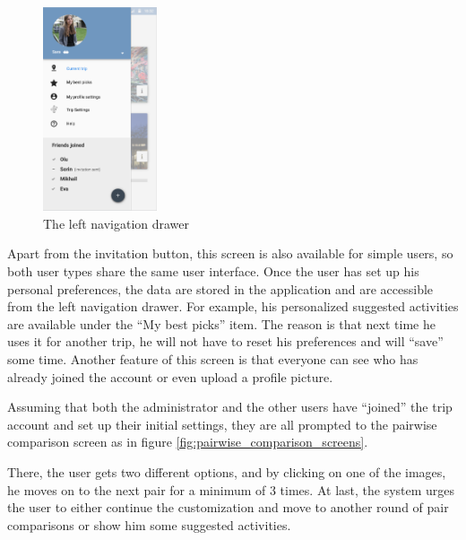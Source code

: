 \documentclass[11pt,a4paper,oneside]{article}
\begin{document}
\begin{figure}[H]
    \centering
    \includegraphics[width=0.3\textwidth]{paper/imgs/hifi_prototypes/left_menu.png}
    \caption{The left navigation drawer}
    \label{fig:left_menu}
\end{figure}

Apart from the invitation button, this screen is also available for simple users, so both user types share the same user interface. Once the user has set up his personal preferences, the data are stored in the application and are accessible from the left navigation drawer. For example, his personalized suggested activities are available under the “My best picks” item. The reason is that next time he uses it for another trip, he will not have to reset his preferences and will “save” some time. Another feature of this screen is that everyone can see who has already joined the account or even upload a profile picture.

Assuming that both the administrator and the other users have “joined” the trip account and set up their initial settings, they are all prompted to the pairwise comparison screen as in figure \ref{fig:pairwise_comparison_screens}.

There, the user gets two different options, and by clicking on one of the images, he moves on to the next pair for a minimum of 3 times. At last, the system urges the user to either continue the customization and move to another round of pair comparisons or show him some suggested activities.
\end{document}
